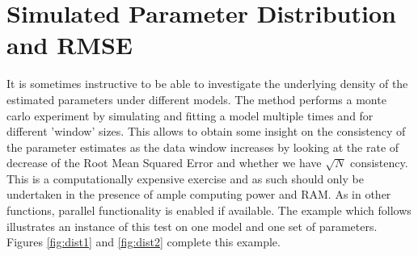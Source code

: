 \section{Simulated Parameter Distribution and RMSE}\label{section:ugarchdist}
It is sometimes instructive to be able to investigate the underlying
density of the estimated parameters under different models. The \verb@ugarchdistribution@
method performs a monte carlo experiment by simulating and fitting a model
multiple times and for different 'window' sizes. This allows to obtain some insight
on the consistency of the parameter estimates as the data window increases by
looking at the rate of decrease of the Root Mean Squared Error and whether we
have $\sqrt N$ consistency. This is a computationally expensive exercise and as
such should only be undertaken in the presence of ample computing power and RAM.
As in other functions, parallel functionality is enabled if available.
The example which follows illustrates an instance of this test on one model and
one set of parameters. Figures \ref{fig:dist1} and \ref{fig:dist2} complete this
example.
